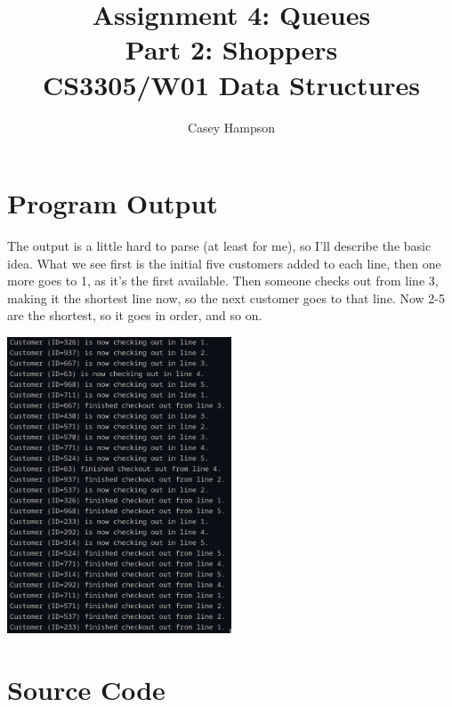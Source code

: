 \documentclass{article}
\title{Assignment 4: Queues \\[5pt] Part 2: Shoppers \\[8pt] CS3305/W01 Data Structures}
\author{Casey Hampson}
\begin{document}
\maketitle


\section*{Program Output}
    The output is a little hard to parse (at least for me), so I'll describe the basic idea. What we see first is the initial five customers added to each line, then one more goes to 1, as it's the first available. Then someone checks out from line 3, making it the shortest line now, so the next customer goes to that line. Now 2-5 are the shortest, so it goes in order, and so on.
    \begin{center}
    \includegraphics[width=0.5\textwidth]{./res/1.png}
    \end{center}





\pagebreak
\section*{Source Code}
\inputminted{java}{./P2.java}
\end{document}
